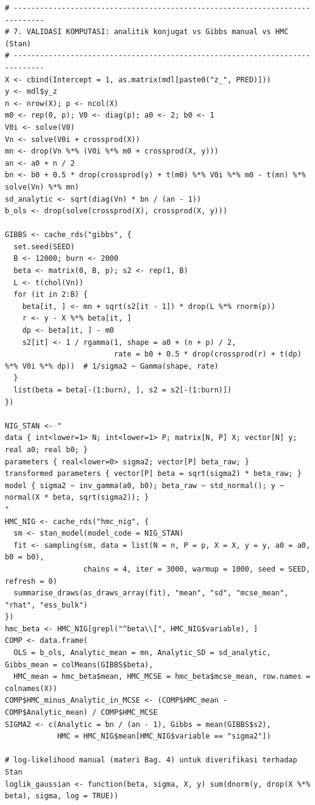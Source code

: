 \documentclass[
]{article}
\begin{document}
\begin{verbatim}
# -----------------------------------------------------------------------------
# 7. VALIDASI KOMPUTASI: analitik konjugat vs Gibbs manual vs HMC (Stan)
# -----------------------------------------------------------------------------
X <- cbind(Intercept = 1, as.matrix(mdl[paste0("z_", PRED)]))
y <- mdl$y_z
n <- nrow(X); p <- ncol(X)
m0 <- rep(0, p); V0 <- diag(p); a0 <- 2; b0 <- 1
V0i <- solve(V0)
Vn <- solve(V0i + crossprod(X))
mn <- drop(Vn %*% (V0i %*% m0 + crossprod(X, y)))
an <- a0 + n / 2
bn <- b0 + 0.5 * drop(crossprod(y) + t(m0) %*% V0i %*% m0 - t(mn) %*% solve(Vn) %*% mn)
sd_analytic <- sqrt(diag(Vn) * bn / (an - 1))
b_ols <- drop(solve(crossprod(X), crossprod(X, y)))

GIBBS <- cache_rds("gibbs", {
  set.seed(SEED)
  B <- 12000; burn <- 2000
  beta <- matrix(0, B, p); s2 <- rep(1, B)
  L <- t(chol(Vn))
  for (it in 2:B) {
    beta[it, ] <- mn + sqrt(s2[it - 1]) * drop(L %*% rnorm(p))
    r <- y - X %*% beta[it, ]
    dp <- beta[it, ] - m0
    s2[it] <- 1 / rgamma(1, shape = a0 + (n + p) / 2,
                         rate = b0 + 0.5 * drop(crossprod(r) + t(dp) %*% V0i %*% dp))  # 1/sigma2 ~ Gamma(shape, rate)
  }
  list(beta = beta[-(1:burn), ], s2 = s2[-(1:burn)])
})

NIG_STAN <- "
data { int<lower=1> N; int<lower=1> P; matrix[N, P] X; vector[N] y; real a0; real b0; }
parameters { real<lower=0> sigma2; vector[P] beta_raw; }
transformed parameters { vector[P] beta = sqrt(sigma2) * beta_raw; }
model { sigma2 ~ inv_gamma(a0, b0); beta_raw ~ std_normal(); y ~ normal(X * beta, sqrt(sigma2)); }
"
HMC_NIG <- cache_rds("hmc_nig", {
  sm <- stan_model(model_code = NIG_STAN)
  fit <- sampling(sm, data = list(N = n, P = p, X = X, y = y, a0 = a0, b0 = b0),
                  chains = 4, iter = 3000, warmup = 1000, seed = SEED, refresh = 0)
  summarise_draws(as_draws_array(fit), "mean", "sd", "mcse_mean", "rhat", "ess_bulk")
})
hmc_beta <- HMC_NIG[grepl("^beta\\[", HMC_NIG$variable), ]
COMP <- data.frame(
  OLS = b_ols, Analytic_mean = mn, Analytic_SD = sd_analytic, Gibbs_mean = colMeans(GIBBS$beta),
  HMC_mean = hmc_beta$mean, HMC_MCSE = hmc_beta$mcse_mean, row.names = colnames(X))
COMP$HMC_minus_Analytic_in_MCSE <- (COMP$HMC_mean - COMP$Analytic_mean) / COMP$HMC_MCSE
SIGMA2 <- c(Analytic = bn / (an - 1), Gibbs = mean(GIBBS$s2),
            HMC = HMC_NIG$mean[HMC_NIG$variable == "sigma2"])

# log-likelihood manual (materi Bag. 4) untuk diverifikasi terhadap Stan
loglik_gaussian <- function(beta, sigma, X, y) sum(dnorm(y, drop(X %*% beta), sigma, log = TRUE))


\end{verbatim}
\end{document}
